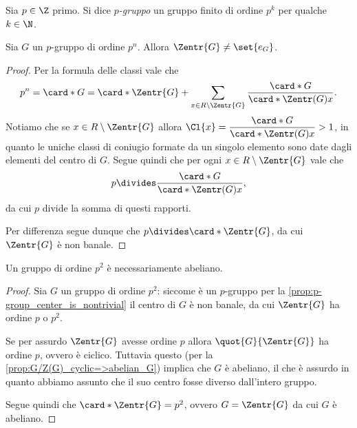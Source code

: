 \begin{definition}
    Sia $p \in \Z$ primo. Si dice \emph{$p$-gruppo} un gruppo finito di ordine $p^k$ per qualche $k \in \N$.
\end{definition}

\begin{proposition}
    \label{prop:p-group_center_is_nontrivial}
    Sia $G$ un $p$-gruppo di ordine $p^n$. Allora $\Zentr{G} \neq \set{e_G}$.
\end{proposition}
\begin{proof}
    Per la formula delle classi vale che \[
        p^n = \card*{G} = \card*{\Zentr{G}} + \sum_{x \in R \setminus \Zentr{G}} \frac{\card*{G}}{\card*{\Zentr(G){x}}}.
    \]
    Notiamo che se $x \in R \setminus \Zentr{G}$ allora $\Cl{x} = \dfrac{\card*{G}}{\card*{\Zentr(G){x}}} > 1$, in quanto le uniche classi di coniugio formate da un singolo elemento sono date dagli elementi del centro di $G$. Segue quindi che per ogni $x \in R \setminus \Zentr{G}$ vale che \[
        p \divides \frac{\card*{G}}{\card*{\Zentr(G){x}}},
    \] da cui $p$ divide la somma di questi rapporti.

    Per differenza segue dunque che $p \divides \card*{\Zentr{G}}$, da cui $\Zentr{G}$ è non banale.
\end{proof}

\begin{proposition}
    Un gruppo di ordine $p^2$ è necessariamente abeliano.
\end{proposition}
\begin{proof}
    Sia $G$ un gruppo di ordine $p^2$: siccome è un $p$-gruppo per la \autoref{prop:p-group_center_is_nontrivial} il centro di $G$ è non banale, da cui $\Zentr{G}$ ha ordine $p$ o $p^2$.

    Se per assurdo $\Zentr{G}$ avesse ordine $p$ allora $\quot{G}{\Zentr{G}}$ ha ordine $p$, ovvero è ciclico. Tuttavia questo (per la \autoref{prop:G/Z(G)_cyclic=>abelian_G}) implica che $G$ è abeliano, il che è assurdo in quanto abbiamo assunto che il suo centro fosse diverso dall'intero gruppo.

    Segue quindi che $\card*{\Zentr{G}} = p^2$, ovvero $G = \Zentr{G}$ da cui $G$ è abeliano.
\end{proof}